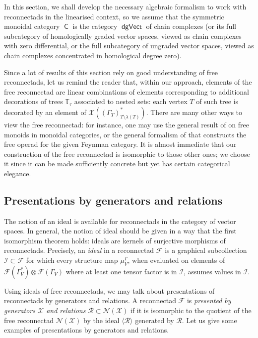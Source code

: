 \documentclass[11pt]{article}
\theoremstyle{definition}
\numberwithin{equation}{section}
\newcommand\calF{\mathcal{F}}
\newcommand\calI{\mathcal{I}}
\newcommand\calN{\mathcal{N}}
\newcommand\calR{\mathcal{R}}
\newcommand\calX{\mathcal{X}}
\DeclareMathOperator{\dgVect}{\mathsf{dgVect}}
\DeclareMathOperator{\sfC}{\mathsf{C}}
\begin{document}
In this section, we shall develop the necessary algebraic formalism to work with reconnectads in the linearised context, so we assume that the symmetric monoidal category $\sfC$ is the category $\dgVect$ of chain complexes (or its full subcategory of homologically graded vector spaces, viewed as chain complexes with zero differential, or the full subcategory of ungraded vector spaces, viewed as chain complexes concentrated in homological degree zero).  

Since a lot of results of this section rely on good understanding of free reconnectads, let us remind the reader that, within our approach, elements of the free reconnectad are linear combinations of elements corresponding to additional decorations of trees $\mathbb{T}_\tau$ associated to nested sets: each vertex $T$ of such tree is decorated by an element of $\calX((\Gamma_T)^*_{T\setminus\lambda(T)})$. There are many other ways to view the free reconnectad: for instance, one may use the general result of \cite{MR2471247} on free monoids in monoidal categories, or the general formalism of \cite{MR3636409} that constructs the free operad for the given Feynman category. It is almost immediate that our construction of the free reconnectad is isomorphic to those other ones; we choose it since it can be made sufficiently concrete but yet has certain categorical elegance. 

\subsection{Presentations by generators and relations}

The notion of an ideal is available for reconnectads in the category of vector spaces. In general, the notion of ideal should be given in a way that the first isomorphism theorem holds: ideals are kernels of surjective morphisms of reconnectads. Precisely, an \emph{ideal} in a reconnectad $\calF$ is a graphical subcollection $\calI\subset\calF$ for which every structure map $\mu_V^\Gamma$, when evaluated on elements of $\calF(\Gamma^*_V)\otimes\calF(\Gamma_V)$ where at least one tensor factor is in $\calI$, assumes values in $\calI$.

Using ideals of free reconnectads, we may talk about presentations of reconnectads by generators and relations.  A reconnectad $\calF$ is \emph{presented by generators $\calX$ and relations $\calR\subset\calN(\calX)$} if it is isomorphic to the quotient of the free reconnectad $\calN(\calX)$ by the ideal $\langle\calR\rangle$ generated by $\calR$. Let us give some examples of presentations by generators and relations. 
\end{document}
